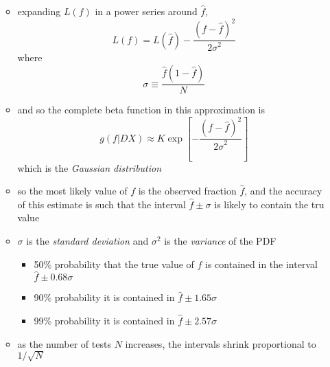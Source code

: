 \documentclass[../jaynes_prob_theory_notes.tex]{subfiles}
\begin{document}
\begin{itemize}
\begin{itemize}
\begin{equation*}
                    \end{equation*}
                \item expanding $L(f)$ in a power series around $\hat{f}$,
                    \begin{equation*}
                        L(f) = L(\hat{f}) - \frac{{(f-\hat{f})}^2}{{2\sigma}^2}
                    \end{equation*}
                where 
                    \begin{equation*}
                        \sigma \equiv \frac{\hat{f}(1-\hat{f})}{N}
                    \end{equation*}
                \item and so the complete beta function in this approximation is 
                    \begin{equation}
                        \label{gauss}
                        g(f|DX) \approx K\exp\left[ - \frac{{(f-\hat{f})}^2}{{2\sigma}^2} \right]
                    \end{equation}
                which is the \textit{Gaussian distribution}
                \item so the most likely value of $f$ is the observed fraction $\hat{f}$, and the accuracy of this estimate is such that the interval $\hat{f} \pm \sigma$ is likely to contain the tru value
                \item $\sigma$ is the \textit{standard deviation} and ${\sigma}^2$ is the \textit{variance} of the PDF
                    \begin{itemize}
                        \item[] 50\% probability that the true value of $f$ is contained in the interval $\hat{f} \pm 0.68\sigma$
                        \item[] 90\% probability it is contained in $\hat{f} \pm 1.65\sigma$
                        \item[] 99\% probability it is contained in $\hat{f} \pm 2.57\sigma$
                    \end{itemize}
                \item as the number of tests $N$ increases, the intervals shrink proportional to $1/\sqrt{N}$
            \end{itemize}
    \end{itemize}
\end{document}
